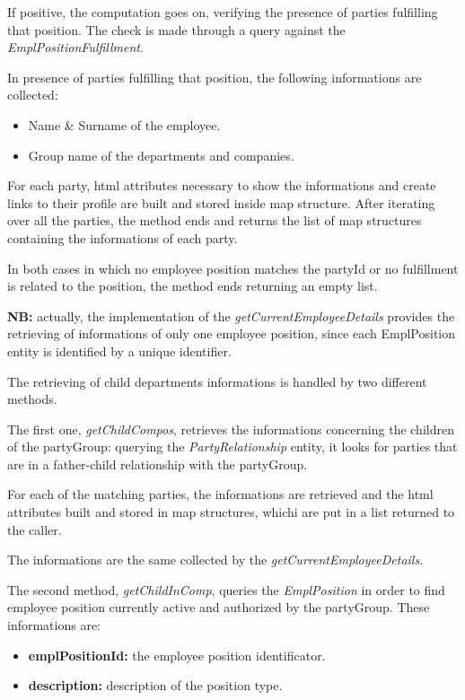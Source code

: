 If positive, the computation goes on, verifying the presence of parties fulfilling that position. The check is made through a query against the \textit{EmplPositionFulfillment}.

In presence of parties fulfilling that position, the following informations are collected:

\begin{itemize}
	\item Name \& Surname of the employee.
	\item Group name of the departments and companies.
\end{itemize}

For each party, html attributes necessary to show the informations and create links to their profile are built and stored inside map structure.
After iterating over all the parties, the method ends and returns the list of map structures containing the informations of each party.

In both cases in which no employee position matches the partyId or no fulfillment is related to the position, the method ends returning an empty list.

\textbf{NB:} actually, the implementation of the \textit{getCurrentEmployeeDetails} provides the retrieving of informations of only one employee position, since each EmplPosition entity is identified by a unique identifier.

The retrieving of child departments informations is handled by two different methods.

The first one, \textit{getChildCompos}, retrieves the informations concerning the children of the partyGroup: querying the \textit{PartyRelationship} entity, it looks for parties that are in a father-child relationship with the partyGroup.

For each of the matching parties, the informations are retrieved and the html attributes built and stored in map structures, whichi are put in a list returned to the caller.

The informations are the same collected by the \textit{getCurrentEmployeeDetails}.

The second method, \textit{getChildInComp}, queries the \textit{EmplPosition} in order to find employee position currently active and authorized by the partyGroup. These informations are:

\begin{itemize}
	\item \textbf{emplPositionId:} the employee position identificator.
	\item \textbf{description:} description of the position type.
\end{itemize}

